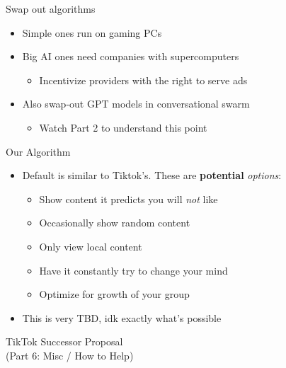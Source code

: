 \documentclass[aspectratio=169]{beamer}
\begin{document}
\begin{frame}{Swap out algorithms}
\vspace{-0.6in}
\begin{itemize}
    \item Simple ones run on gaming PCs
    \item Big AI ones need companies with supercomputers
    \begin{itemize}
        \item Incentivize providers with the right to serve ads
    \end{itemize}
    \item Also swap-out GPT models in conversational swarm
    \begin{itemize}
        \item Watch Part 2 to understand this point
    \end{itemize}
\end{itemize}
\end{frame}

\begin{frame}{Our Algorithm}
\vspace{-0.7in}
\begin{itemize}
    \item Default is similar to Tiktok's. These are \textbf{potential} \textit{options}:
    \begin{itemize}
        \item Show content it predicts you will \textit{not} like
        \item Occasionally show random content
        \item Only view local content
        \item Have it constantly try to change your mind
        \item Optimize for growth of your group
    \end{itemize}
    \item This is very TBD, idk exactly what's possible
\end{itemize}
\end{frame}

\begin{frame}
    \centering
    \Huge TikTok Successor Proposal \\
    \Huge (Part 6: Misc / How to Help)
\end{frame}
\end{document}
